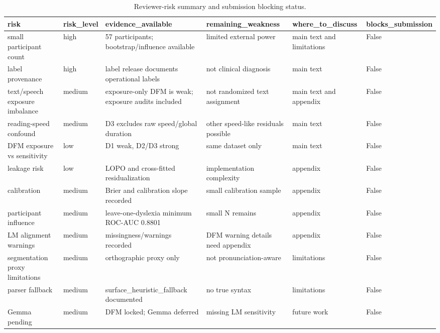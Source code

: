 \begin{table}[t]
\centering
\small
\caption{Reviewer-risk summary and submission blocking status.}
\label{tab:reviewer-risk}
\begin{tabular}{llllll}
\toprule
risk & risk\_level & evidence\_available & remaining\_weakness & where\_to\_discuss & blocks\_submission \\
\midrule
small participant count & high & 57 participants; bootstrap/influence available & limited external power & main text and limitations & False \\
label provenance & high & label release documents operational labels & not clinical diagnosis & main text & False \\
text/speech exposure imbalance & medium & exposure-only DFM is weak; exposure audits included & not randomized text assignment & main text and appendix & False \\
reading-speed confound & medium & D3 excludes raw speed/global duration & other speed-like residuals possible & main text & False \\
DFM exposure vs sensitivity & low & D1 weak, D2/D3 strong & same dataset only & main text & False \\
leakage risk & low & LOPO and cross-fitted residualization & implementation complexity & appendix & False \\
calibration & medium & Brier and calibration slope recorded & small calibration sample & appendix & False \\
participant influence & medium & leave-one-dyslexia minimum ROC-AUC 0.8801 & small N remains & appendix & False \\
LM alignment warnings & medium & missingness/warnings recorded & DFM warning details need appendix & appendix & False \\
segmentation proxy limitations & medium & orthographic proxy only & not pronunciation-aware & limitations & False \\
parser fallback & medium & surface\_heuristic\_fallback documented & no true syntax & limitations & False \\
Gemma pending & medium & DFM locked; Gemma deferred & missing LM sensitivity & future work & False \\
\bottomrule
\end{tabular}
\end{table}
